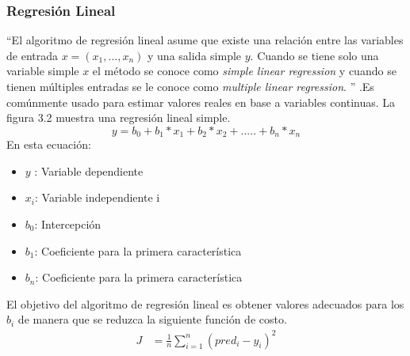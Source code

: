 \subsubsection*{Regresión Lineal}
\textquotedblleft El algoritmo de regresión lineal asume que existe una relación entre las variables de entrada $x=(x_{1},...,x_{n})$ y una salida simple $y$.  Cuando se tiene solo una variable simple $x$ el método se conoce como \textit{simple linear regression} y cuando se tienen múltiples entradas se le conoce como \textit{multiple linear regression}.  \textquotedblright \cite{WEBSITE:3} .Es comúnmente usado para estimar valores reales en base a variables continuas. La figura 3.2 muestra una regresión lineal simple.
\begin{equation}
\label{Simple learning regression}
y=b_{0}+b_{1}*x_{1}+b_{2}*x_{2}+.....+b_{n}*x_{n}
\end{equation} 
En esta ecuación:
\begin{itemize}
	\item $y$    : Variable dependiente
	\item $x_{i}$: Variable independiente i
	\item $b_{0}$: Intercepción
	\item $b_{1}$: Coeficiente para la primera característica
	\item $b_{n}$: Coeficiente para la primera característica
	
\end{itemize}
El objetivo del algoritmo de regresión lineal es obtener valores adecuados para los $b_{i}$  de manera que se reduzca la siguiente función de costo.
 \begin{equation}
 \label{eq:T3}
 \begin{aligned}
 J&=\frac{1}{n} \sum_{i=1}^{n}(pred_{i}-y_{i})^2
 \end{aligned}
 \end{equation}


